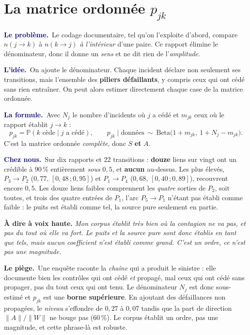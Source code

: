 \documentclass[11pt,a4paper]{article}
\providecommand{\Prob}{\mathbb{P}}
\newcommand{\lequoi}[1]{\smallskip\noindent\textcolor{navy}{\textbf{Le problème.}}\ #1\par}
\newcommand{\lidee}[1]{\smallskip\noindent\textcolor{navy}{\textbf{L'idée.}}\ #1\par}
\newcommand{\laformule}[1]{\smallskip\noindent\textcolor{navy}{\textbf{La formule.}}\ #1\par}
\newcommand{\cheznous}[1]{\smallskip\noindent\textcolor{navy}{\textbf{Chez nous.}}\ #1\par}
\newcommand{\lepiege}[1]{\smallskip\noindent\textcolor{accent}{\textbf{Le piège.}}\ #1\par}
\newcommand{\laphrase}[1]{\begin{phrasebox}\textbf{À dire à voix haute.} \emph{#1}\end{phrasebox}}
\begin{document}
\section{La matrice ordonnée $p_{jk}$}

\lequoi{Le codage documentaire, tel qu'on l'exploite d'abord, compare $n(j\to k)$ à
$n(k\to j)$ \emph{à l'intérieur} d'une paire. Ce rapport élimine le dénominateur, donc il
donne un \emph{sens} et ne dit rien de l'\emph{amplitude}.}

\lidee{On ajoute le dénominateur. Chaque incident déclare non seulement ses transitions, mais
l'ensemble des \textbf{piliers défaillants}, y compris ceux qui ont cédé sans rien entraîner.
On peut alors estimer directement chaque case de la matrice ordonnée.}

\laformule{Avec $N_j$ le nombre d'incidents où $j$ a cédé et $m_{jk}$ ceux où le rapport
établit $j\to k$ :
\[
  p_{jk}=\Prob(k \text{ cède}\mid j \text{ a cédé}),
  \qquad
  p_{jk}\mid\text{données}\ \sim\ \mathrm{Beta}\bigl(1+m_{jk},\ 1+N_j-m_{jk}\bigr).
\]
C'est la matrice ordonnée \emph{complète}, donc $S$ \textbf{et} $A$.}

\cheznous{Sur dix rapports et $22$ transitions : \textbf{douze} liens sur vingt ont un crédible
à $90\,\%$ entièrement \emph{sous} $0{,}5$, et \textbf{aucun} au-dessus. Les plus élevés,
$P_3\to P_2$ ($0{,}77$, $[0{,}48\,;0{,}95]$) et $P_1\to P_4$ ($0{,}68$, $[0{,}40\,;0{,}89]$),
recouvrent encore $0{,}5$. Les douze liens faibles comprennent les \emph{quatre} sorties de
$P_2$, soit toutes, et trois des quatre entrées de $P_1$, l'arc $P_5\to P_1$ n'étant pas établi
comme faible : le puits est établi comme tel, la source pure seulement en partie.}

\laphrase{Mon corpus établit très bien où la contagion \emph{ne va pas}, et pas du tout où elle
va fort. Le puits et la source pure sont donc établis en tant que tels, mais aucun coefficient
n'est établi comme grand. C'est un ordre, ce n'est pas une magnitude.}

\lepiege{Une enquête raconte la \emph{chaîne} qui a produit le sinistre : elle documente bien
les contrôles qui ont cédé \emph{et} propagé, mal ceux qui ont cédé sans propager, pas du tout
ceux qui ont tenu. Le dénominateur $N_j$ est donc sous-estimé et $p_{jk}$ est une \textbf{borne
supérieure}. En ajoutant des défaillances non propagées, le \emph{niveau} s'effondre de
$0{,}27$ à $0{,}07$ tandis que la part de direction $\lVert A\rVert/\lVert W\rVert$ ne bouge
pas ($60\,\%$). Le corpus établit un ordre, pas une magnitude, et cette phrase-là est robuste.}
\end{document}
